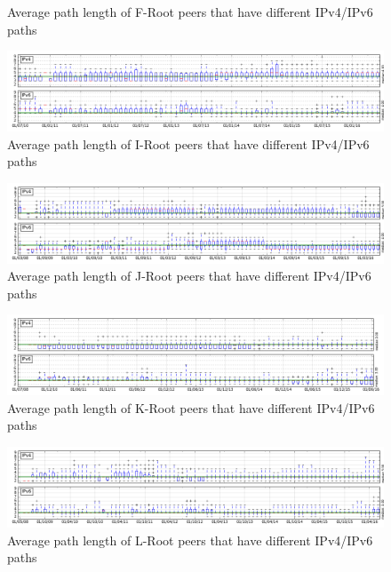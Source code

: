 \begin{appendices}
\begin{figure}[!htb]
			\caption{Average path length of F-Root peers that have different IPv4/IPv6 paths}
			\label{fig:path-avg-diff-f}
		\end{figure}
		\begin{figure}[!htb]
			\centering
			\includegraphics[width=6.0in]{img/path_avg_diff_i.png}
			\caption{Average path length of I-Root peers that have different IPv4/IPv6 paths}
			\label{fig:path-avg-diff-i}
		\end{figure}
		\begin{figure}[!htb]
			\centering
			\includegraphics[width=6.0in]{img/path_avg_diff_j.png}
			\caption{Average path length of J-Root peers that have different IPv4/IPv6 paths}
			\label{fig:path-avg-diff-j}
		\end{figure}
		\begin{figure}[!htb]
			\centering
			\includegraphics[width=6.0in]{img/path_avg_diff_k.png}
			\caption{Average path length of K-Root peers that have different IPv4/IPv6 paths}
			\label{fig:path-avg-diff-k}
		\end{figure}
		\begin{figure}[!htb]
			\centering
			\includegraphics[width=6.0in]{img/path_avg_diff_l.png}
			\caption{Average path length of L-Root peers that have different IPv4/IPv6 paths}

\end{figure}
\end{appendices}
